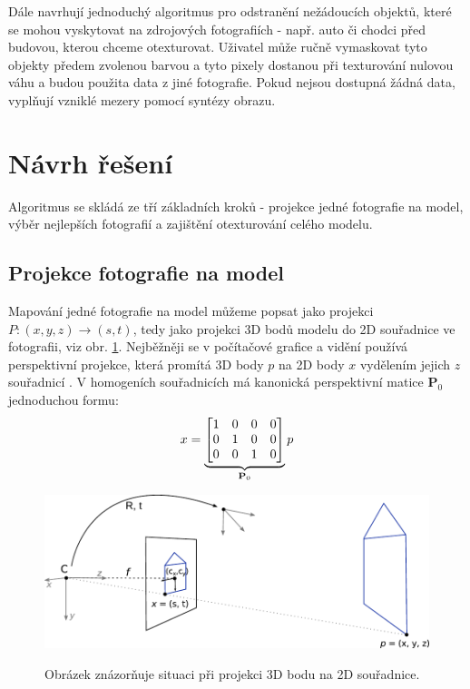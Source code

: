 \documentclass[11pt,twoside,a4paper]{book}
\begin{document}
Dále navrhují jednoduchý algoritmus pro odstranění nežádoucích objektů, které se mohou vyskytovat na zdrojových fotografiích - např. auto či chodci před budovou, kterou chceme otexturovat. Uživatel může ručně vymaskovat tyto objekty předem zvolenou barvou a tyto pixely dostanou při texturování nulovou váhu a budou použita data z jiné fotografie. Pokud nejsou dostupná žádná data, vyplňují vzniklé mezery pomocí syntézy obrazu.

\section{Návrh řešení}

Algoritmus se skládá ze tří základních kroků - projekce jedné fotografie na model, výběr nejlepších fotografií a zajištění otexturování celého modelu.

\subsection{Projekce fotografie na model}
\label{sec:matice-kamery}

Mapování jedné fotografie na model můžeme popsat jako projekci $P: (x, y, z) \to (s, t)$, tedy jako projekci 3D bodů modelu do 2D souřadnice ve fotografii, viz obr. \ref{fig:camera-projection}. Nejběžněji se v počítačové grafice a vidění používá perspektivní projekce, která promítá 3D body $p$ na 2D body $x$ vydělením jejich $z$ souřadnicí \cite{Szeliski}. V homogeních souřadnicích má kanonická perspektivní matice \textbf{P}$_0$ jednoduchou formu:
\begin{align}
\label{eq:persp-projection}
x = 
\underbrace{
\begin{bmatrix}
1 & 0 & 0 & 0 \\
0 & 1 & 0 & 0 \\
0 & 0 & 1 & 0 \\
\end{bmatrix}}_\text{\textbf{P}$_0$}
p
\end{align}
\noindent

\begin{figure}[t]
\begin{center}
\label{fig:camera-projection}
\includegraphics[width=\textwidth]{figures/camera-projection}
\caption{Obrázek znázorňuje situaci při projekci 3D bodu na 2D souřadnice.}
\end{center}
\end{figure}
\end{document}
